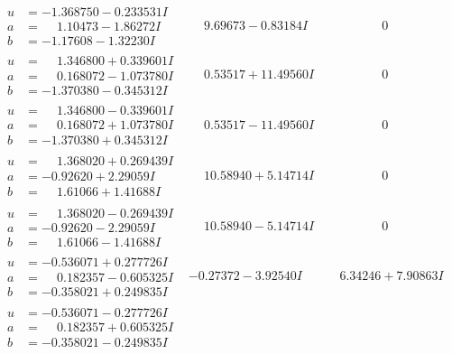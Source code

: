 \documentclass[1p]{elsarticle_modified}
\theoremstyle{definition}
\begin{document}
$$\begin{array}{c|c|c}
\begin{aligned}
u &= -1.368750 - 0.233531 I \\
a &= \phantom{-}1.10473 - 1.86272 I \\
b &= -1.17608 - 1.32230 I\end{aligned}
 & \phantom{-}9.69673 - 0.83184 I & \phantom{-0.000000 } 0 \\ \hline\begin{aligned}
u &= \phantom{-}1.346800 + 0.339601 I \\
a &= \phantom{-}0.168072 - 1.073780 I \\
b &= -1.370380 - 0.345312 I\end{aligned}
 & \phantom{-}0.53517 + 11.49560 I & \phantom{-0.000000 } 0 \\ \hline\begin{aligned}
u &= \phantom{-}1.346800 - 0.339601 I \\
a &= \phantom{-}0.168072 + 1.073780 I \\
b &= -1.370380 + 0.345312 I\end{aligned}
 & \phantom{-}0.53517 - 11.49560 I & \phantom{-0.000000 } 0 \\ \hline\begin{aligned}
u &= \phantom{-}1.368020 + 0.269439 I \\
a &= -0.92620 + 2.29059 I \\
b &= \phantom{-}1.61066 + 1.41688 I\end{aligned}
 & \phantom{-}10.58940 + 5.14714 I & \phantom{-0.000000 } 0 \\ \hline\begin{aligned}
u &= \phantom{-}1.368020 - 0.269439 I \\
a &= -0.92620 - 2.29059 I \\
b &= \phantom{-}1.61066 - 1.41688 I\end{aligned}
 & \phantom{-}10.58940 - 5.14714 I & \phantom{-0.000000 } 0 \\ \hline\begin{aligned}
u &= -0.536071 + 0.277726 I \\
a &= \phantom{-}0.182357 - 0.605325 I \\
b &= -0.358021 + 0.249835 I\end{aligned}
 & -0.27372 - 3.92540 I & \phantom{-}6.34246 + 7.90863 I \\ \hline\begin{aligned}
u &= -0.536071 - 0.277726 I \\
a &= \phantom{-}0.182357 + 0.605325 I \\
b &= -0.358021 - 0.249835 I\end{aligned}

\end{array}$$
\end{document}
